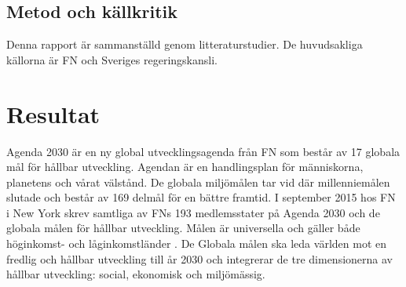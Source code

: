 \documentclass{report}
\begin{document}
\subsection{Metod och källkritik}
Denna rapport är sammanställd genom litteraturstudier. De huvudsakliga källorna är FN och Sveriges regeringskansli. 
\newpage 
\section{Resultat}
Agenda 2030 är en ny global utvecklingsagenda från FN som består av 17 globala mål för hållbar utveckling. \cite{webUNASweden} Agendan\cite{nam2015transforming} är en handlingsplan för människorna, planetens och vårat välstånd. De globala miljömålen tar vid där millenniemålen slutade och består av 169 delmål för en bättre framtid. I september 2015 hos FN i New York skrev samtliga av FNs 193 medlemsstater på Agenda 2030 och de globala målen för hållbar utveckling.\cite{webUNASweden} Målen är universella och gäller både höginkomst- och låginkomstländer \cite{webUNDP}. De Globala målen ska leda världen mot en fredlig och hållbar utveckling till år 2030 och integrerar de tre dimensionerna av hållbar utveckling: social, ekonomisk och miljömässig.  \cite{webUNASweden}\\
\end{document}
